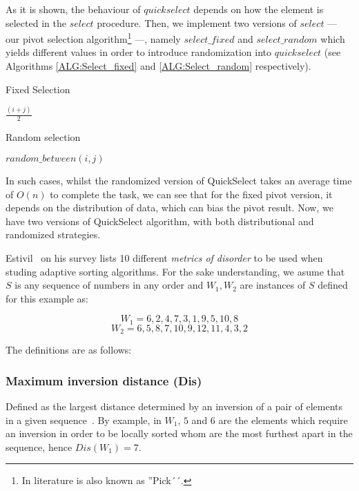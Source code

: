 As it is shown, the behaviour of $quickselect$ depends on how the element is selected in the $select$ procedure. Then, we implement two versions of $select$ --- our pivot selection algorithm\footnote{In literature is also known as ''Pick´´.} ---, namely $select\_fixed$ and $select\_random$ which yields different values in order to introduce randomization into $quickselect$ (see Algorithms \ref{ALG:Select_fixed} and \ref{ALG:Select_random} respectively).

\begin{algorithm}
  \caption{Fixed Selection}\label{ALG:Select_fixed}
  \begin{algorithmic}[1]
    \State \Return $\frac{(i+j)}{2}$
    \EndProcedure
  \end{algorithmic}
\end{algorithm}

\begin{algorithm}
  \caption{Random selection}\label{ALG:Select_random}
  \begin{algorithmic}[1]
    \State \Return $random\_between(i,j)$
    \EndProcedure
  \end{algorithmic}
\end{algorithm}

In such cases, whilst the randomized version of QuickSelect takes an average time of $O(n)$ to complete the task, we can see that for the fixed pivot version, it depends on the distribution of data, which can bias the pivot result. Now, we have two versions of QuickSelect algorithm, with both distributional and randomized strategies.

Estivil~\cite{estivil92} on his survey lists 10 different \textit{metrics of disorder} to be used when studing adaptive sorting algorithms. For the sake understanding, we asume that $S$ is any sequence of numbers in any order and $W_1,W_2$ are instances of $S$ defined for this example as: 

$$W_1 = {6,2,4,7,3,1,9,5,10,8}$$
$$W_2 = {6,5,8,7,10,9,12,11,4,3,2}$$

The definitions are as follows:

\subsubsection{Maximum inversion distance (Dis)}
Defined as the largest distance determined by an inversion of a pair of elements in a given sequence~\cite{Estivill-Castro_Wood_1989}.  By example, in $W_1$,  $5$ and $6$ are the elements which require an inversion in order to be locally sorted whom are the most furthest apart in the sequence, hence $Dis(W_1) = 7$.

